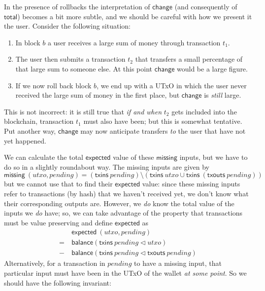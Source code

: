 \documentclass{article}
\newcommand{\restrictdom}{\lhd}
\begin{document}
In the presence of rollbacks the interpretation of $\mathsf{change}$ (and
consequently of $\mathsf{total}$) becomes a bit more subtle, and we should be
careful with how we present it the user. Consider the following situation:
%
\begin{enumerate}
\item In block $b$ a user receives a large sum of money through transaction
$t_1$.
\item The user then submits a transaction $t_2$ that transfers a small
percentage of that large sum to someone else. At this point $\mathsf{change}$
would be a large figure.
\item If we now roll back block $b$, we end up with a UTxO in
which the user never received the large sum of money in the first place, but
$\mathsf{change}$ is \emph{still} large.
\end{enumerate}

This is not incorrect: it is still true that \emph{if and when} $t_2$ gets
included into the blockchain, transaction $t_1$ must also have been; but this is
somewhat tentative. Put another way, $\mathsf{change}$ may now anticipate
transfers \emph{to} the user that have not yet happened.

We can calculate the total $\mathsf{expected}$ value of these $\mathsf{missing}$
inputs, but we have to do so in a slightly roundabout way. The missing inputs
are given by
%
\begin{equation*}
\mathsf{missing} ~ (\mathit{utxo}, \mathit{pending})
= (\mathsf{txins} ~ \mathit{pending}) \setminus
(\mathsf{txins} ~ \mathit{utxo} \cup \mathsf{txins} ~ (\mathsf{txouts} ~ \mathit{pending}))
\end{equation*}
%
but we cannot use that to find their $\mathsf{expected}$ value: since these
missing inputs refer to transactions (by hash) that we haven't received yet,
we don't know what their corresponding outputs are. However, we \emph{do}
know the total value of the inputs we \emph{do} have; so, we can take advantage
of the property that transactions must be value preserving and define
$\mathsf{expected}$ as
%
\begin{align*}
  & ~ \mathsf{expected} ~ (\mathit{utxo}, \mathit{pending}) \\
= & ~ \mathsf{balance} (\mathsf{txins} ~ \mathit{pending} \restrictdom \mathit{utxo}) \\
- & ~ \mathsf{balance} (\mathsf{txins} ~ \mathit{pending} \restrictdom \mathsf{txouts} ~ \mathit{pending})
\end{align*}
%
Alternatively, for a transaction in $\mathit{pending}$ to have a missing input,
that particular input must have been in the UTxO of the wallet \emph{at some
point}. So we should have the following invariant:
\end{document}
